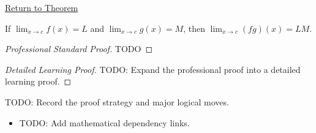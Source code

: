 \newpage
{}
\label{prf:product-rule-function-limits}

\begin{remark*}[Return]
\hyperref[thm:product-rule-function-limits]{Return to Theorem}
\end{remark*}

\begin{theorem*}
If $\lim_{x\to c}f(x)=L$ and $\lim_{x\to c}g(x)=M$, then $\lim_{x\to c}(fg)(x)=LM$.
\end{theorem*}

\begin{proof}[Professional Standard Proof]
\LRAProofBodyStart
TODO
\end{proof}

\begin{proof}[Detailed Learning Proof]
\LRAProofBodyStart
TODO: Expand the professional proof into a detailed learning proof.
\end{proof}

\begin{remark*}
TODO: Record the proof strategy and major logical moves.
\end{remark*}

\begin{dependencies}
\begin{itemize}
  \item TODO: Add mathematical dependency links.
\end{itemize}
\end{dependencies}
